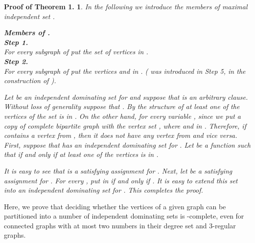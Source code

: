 \documentclass[
final
]{dmtcs-episciences}
\newtheorem{preali}{{\bf Proof of Theorem 1.}}
\newenvironment{ali}[1]{\begin{preali}{\rm
			#1}\hfill{}}{\end{preali}}
\begin{document}
\begin{ali}
{		In the following we introduce the members of maximal independent set .
		
		{{\bf  Members of .}}\\
		{{\bf Step 1.}}\\
		For every subgraph    of  put the set of vertices  in .\\
		{{\bf Step 2.}}\\
		For every subgraph   of  put the vertices  and  in . ( was introduced in Step 5, in the construction of ).
		
		Let  be an independent dominating set for  and
		suppose that  is an arbitrary clause. Without loss of generality suppose that . By the structure of  at least one of the vertices of the set  is in . On the other hand, for every variable , since we put a copy of complete bipartite graph  with the vertex set , where  and  in .
		Therefore, if  contains a vertex from  , then it does not have any vertex from  and vice versa.
		First, suppose that  has an independent dominating set  for .
		Let  be a function such that  if and only if at least one of the vertices  is in .
		
		
		It is easy to see that
		 is a   satisfying assignment for . Next, let   be
		a   satisfying assignment for . For every , put   in  if and only if . It is easy to extend this set into an independent dominating set for . This completes the proof.
}\end{ali}


Here, we prove that deciding whether the vertices of a given  graph  can be partitioned into a number of  independent dominating sets is  -complete, even for connected graphs with at most two numbers in their degree set and  3-regular graphs.
\end{document}

